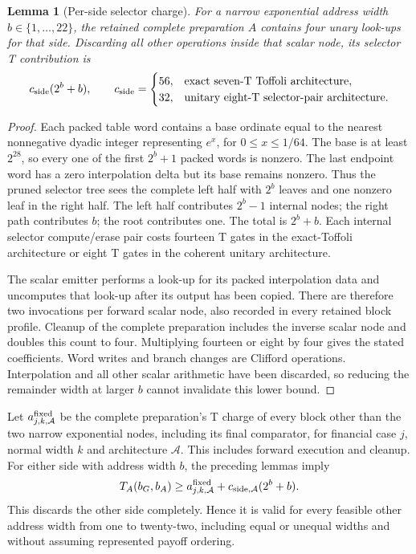 \documentclass[11pt]{article}
\newtheorem{lemma}[theorem]{Lemma}
\begin{document}
\begin{lemma}[Per-side selector charge]
\label{lem:raw-asymmetric-one-side-selector}
For a narrow exponential address width $b\in\{1,\ldots,22\}$,
the retained complete preparation $A$ contains four unary look-ups for
that side. Discarding all other operations inside that scalar node, its
selector T contribution is
\begin{equation}
 c_{\rm side}(2^b+b),\qquad
 c_{\rm side}=\begin{cases}
 56,&\text{exact seven-T Toffoli architecture},\\
 32,&\text{unitary eight-T selector-pair architecture}.
 \end{cases}
\end{equation}
\end{lemma}
\begin{proof}
Each packed table word contains a base ordinate equal to the nearest
nonnegative dyadic integer representing $e^x$, for $0\leq x\leq1/64$.
The base is at least $2^{28}$, so every one of the first $2^b+1$
packed words is nonzero. The last endpoint word has a zero interpolation
delta but its base remains nonzero. Thus the pruned selector tree sees
the complete left half with $2^b$ leaves and one nonzero leaf in the
right half. The left half contributes $2^b-1$ internal nodes; the
right path contributes $b$; the root contributes one. The total is
$2^b+b$. Each internal selector compute/erase pair costs fourteen T
gates in the exact-Toffoli architecture or eight T gates in the coherent
unitary architecture.

The scalar emitter performs a look-up for its packed interpolation data
and uncomputes that look-up after its output has been copied. There
are therefore two invocations per forward scalar node, also recorded
in every retained block profile. Cleanup of the complete preparation
includes the inverse scalar node and doubles this count to four.
Multiplying fourteen or eight by four gives the stated coefficients.
Word writes and branch changes are Clifford operations. Interpolation
and all other scalar arithmetic have been discarded, so reducing the
remainder width at larger $b$ cannot invalidate this lower bound.
\end{proof}

Let $a^{\rm fixed}_{j,k,\mathcal A}$ be the complete preparation's
T charge of every block other than the two narrow exponential nodes,
including its final comparator, for financial case $j$, normal width
$k$ and architecture $\mathcal A$. This includes forward execution
and cleanup. For either side with address width $b$, the preceding
lemmas imply
\begin{equation}
 T_A(b_G,b_A)\geq a^{\rm fixed}_{j,k,\mathcal A}
                         +c_{\rm side,\mathcal A}(2^b+b).
\label{eq:raw-asymmetric-one-side-A-floor}
\end{equation}
This discards the other side completely. Hence it is valid for every
feasible other address width from one to twenty-two, including equal
or unequal widths and without assuming represented payoff ordering.
\end{document}
